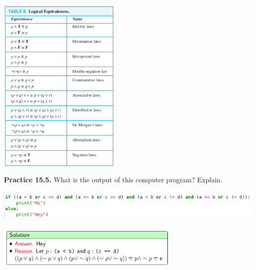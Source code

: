 \documentclass[aspectratio=169]{beamer}
\providecommand{\Blue}[1]{\textcolor{blue}{#1}}
\begin{document}
\begin{frame}[plain]{}
  
  \begin{center}
   \includegraphics[height=8.7cm]{./img/lecture15-fig1.png}
  \end{center}  
 
\end{frame}



\begin{frame}[plain]{} 

  {\bf Practice 15.5.} What is the output of this computer program? Explain.
  \begin{center}
   \includegraphics[height=1.5cm]{./img/lecture15-fig2.png}\pause
   
   \includegraphics[height=2cm]{./img/lecture15-fig2-answer.png}
  \end{center}  
    
    \vspace{1in}
    
  
\end{frame}
\end{document}
